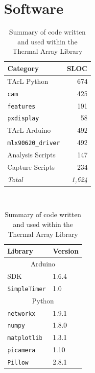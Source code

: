 \documentclass[../thesis/thesis.tex]{subfiles}
\begin{document}
\section{Software}

\begin{table}
\centering
\begin{subtable}[b]{0.5\textwidth}
\centering
\begin{tabular}{|l|r|}
\hline
\textbf{Category} & \textbf{SLOC}  \\ \hline
TArL Python       & 674            \\ \hline
\hspace{5mm}\texttt{cam}        & 425           \\ \hline
\hspace{5mm}\texttt{features}   & 191           \\ \hline
\hspace{5mm}\texttt{pxdisplay}  & 58            \\ \hline
TArL Arduino  & 492            \\ \hline
\hspace{5mm}\texttt{mlx90620\_driver}  & 492          \\ \hline
Analysis Scripts  & 147            \\ \hline
Capture Scripts   & 234            \\ \hline
\textit{Total}    & \textit{1,624} \\ \hline
\end{tabular}
\caption{Source Lines Of Code written}
\end{subtable}%
~%
\begin{subtable}[b]{0.5\textwidth}
\centering
\begin{tabular}{|l|l|}
\hline
\textbf{Library}     & \multicolumn{1}{l|}{\textbf{Version}} \\ \hline
\multicolumn{2}{|c|}{Arduino}                                \\ \hline
SDK                  & 1.6.4                                 \\ \hline
\texttt{SimpleTimer} & 1.0                                   \\ \hline
\multicolumn{2}{|c|}{Python}                                 \\ \hline
\texttt{networkx}    & 1.9.1                                 \\ \hline
\texttt{numpy}       & 1.8.0                                 \\ \hline
\texttt{matplotlib}  & 1.3.1                                 \\ \hline
\texttt{picamera}    & 1.10                                  \\ \hline
\texttt{Pillow}      & 2.8.1                                 \\ \hline
\end{tabular}
\caption{Libraries used}
\end{subtable}
\caption{Summary of code written and used within the Thermal Array Library}
\end{table}
\end{document}
